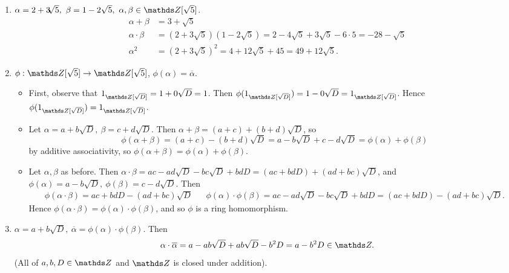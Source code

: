\documentclass{homework}
\begin{document}
\begin{solution}
  \begin{enumerate}[label=(\alph*)]
    \item $\alpha=2+3\sqrt[]{5},\ \beta=1-2\sqrt{5},\ \alpha,\beta\in \Z[\sqrt{5} ]$.
      \begin{align*}
        \alpha+\beta&= 3+\sqrt{5}  \\
        \alpha\cdot \beta&= (2+3\sqrt{5} )(1-2\sqrt{5} )=2-4\sqrt{5} +3\sqrt{5} -6\cdot
        5=-28-\sqrt{5}  \\
        \alpha^2&= (2+3\sqrt{5} )^2=4+12\sqrt{5} +45=49+12\sqrt{5} 
      .\end{align*}
    \item $\phi:\Z[\sqrt{5} ]\to \Z[\sqrt{5} ]$, $\phi(\alpha)=\overline{\alpha}$.
      \begin{itemize}
        \item First, observe that $1_{\Z[\sqrt{D} ]}=1+0\sqrt{D} =1$. Then $\phi(1_{\Z[\sqrt{D}
          ]})=1-0\sqrt{D} =1_{\Z[\sqrt{D}]}$. Hence $\phi(1_{\Z[\sqrt{D}]})=1_{\Z[\sqrt{D}]}$.
        \item Let $\alpha=a+b\sqrt{D},\ \beta=c+d\sqrt{D}$. Then $\alpha+\beta=(a+c)+(b+d)\sqrt{D}$,
          so \[
            \phi(\alpha+\beta)=(a+c)-(b+d)\sqrt{D} =a-b\sqrt{D} +c-d\sqrt{D} =\phi(\alpha)+\phi(\beta)
          \] by additive associativity, so $\phi(\alpha+\beta)=\phi(\alpha)+\phi(\beta)$.
        \item Let $\alpha,\beta$ as before. Then $\alpha\cdot \beta=ac-ad\sqrt{D} -bc\sqrt{D}
          +bdD=(ac+bdD)+(ad+bc)\sqrt{D} $, and $\phi(\alpha)=a-b\sqrt{D} ,\
          \phi(\beta)=c-d\sqrt{D} $. Then
          \begin{align*}
            \phi(\alpha\cdot \beta)=ac+bdD-(ad+bc)\sqrt{D} && \phi(\alpha)\cdot
            \phi(\beta)=ac-ad\sqrt{D} -bc\sqrt{D} +bdD=(ac+bdD)-(ad+bc)\sqrt{D} 
          .\end{align*} Hence $\phi(\alpha\cdot \beta)=\phi(\alpha)\cdot \phi(\beta)$, and so
          $\phi$ is a ring homomorphism.
      \end{itemize}

    \item $\alpha=a+b\sqrt{D},\ \overline{\alpha}=\phi(\alpha)\cdot \phi(\beta)$. Then \[
      \alpha\cdot \overline{\alpha}=a-ab \sqrt{D} +ab \sqrt{D} -b^2D=a-b^2D\in \Z
    .\] (All of $a,b,D\in \Z$ and $\Z$ is closed under addition).
  \end{enumerate}
\end{solution}
\end{document}

